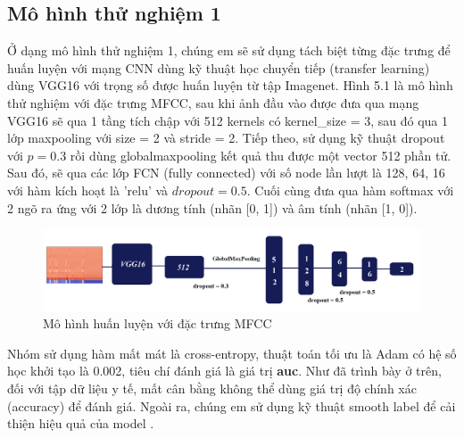 \documentclass[a4paper, 12pt]{article}
\begin{document}
\subsection{Mô hình thử nghiệm 1}

\noindent
Ở dạng mô hình thử nghiệm 1, chúng em sẽ sử dụng tách biệt từng đặc trưng để huấn luyện với mạng CNN dùng kỹ thuật học chuyển tiếp (transfer learning) dùng VGG16 với trọng số được huấn luyện từ tập Imagenet. Hình 5.1 là mô hình thử nghiệm với đặc trưng MFCC, sau khi ảnh đầu vào được đưa qua mạng VGG16 sẽ qua 1 tầng tích chập với 512 kernels có kernel\_size = 3, sau đó qua 1 lớp maxpooling với size = 2 và stride = 2. Tiếp theo, sử dụng kỹ thuật dropout với $p=0.3$ rồi dùng globalmaxpooling kết quả thu được một vector 512 phần tử. Sau đó, sẽ qua các lớp FCN (fully connected) với số node lần lượt là 128, 64, 16 với hàm kích hoạt là 'relu' và $dropout=0.5$. Cuối cùng đưa qua hàm softmax với 2 ngõ ra ứng với 2 lớp là dương tính (nhãn [0, 1]) và âm tính (nhãn [1, 0]).

\begin{figure}[!h]
\captionsetup{width=0.8\textwidth}
\centering
\includegraphics[width=15.5cm]{images/model 1.png}
\caption{Mô hình huấn luyện với đặc trưng MFCC}
\end{figure}

\noindent
Nhóm sử dụng hàm mất mát là cross-entropy, thuật toán tối ưu là Adam có hệ số học khởi tạo là 0.002, tiêu chí đánh giá là giá trị \textbf{auc}. Như đã trình bày ở trên, đối với tập dữ liệu y tế, mất cân bằng không thể dùng giá trị độ chính xác (accuracy) để đánh giá. Ngoài ra, chúng em sử dụng kỹ thuật smooth label để cải thiện hiệu quả của model \cite{DBLP:journals/corr/abs-1906-02629}.
\end{document}
